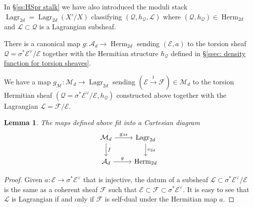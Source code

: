 \documentclass[reqno]{amsart}
\numberwithin{equation}{section}
\newcommand\mnote[1]{\marginpar{\tiny #1}}
\newcommand{\Cal}[1]{\mathcal{#1}}
\DeclareMathOperator{\Herm}{Herm}
\DeclareMathOperator{\Lagr}{Lagr}
\newcommand\xr{\xrightarrow}
\newcommand\ot{\otimes}
\newcommand{\s}{\sigma}
\newcommand\cE{\mathcal{E}}
\newcommand\cF{\mathcal{F}}
\newcommand\cL{\mathcal{L}}
\newcommand\cM{\mathcal{M}}
\newcommand\cQ{\mathcal{Q}}
\newtheorem{lemma}[thm]{Lemma}
\theoremstyle{remark}
\numberwithin{equation}{section}
\begin{document}
In \S\ref{ss:HSpr stalk} we have also introduced the moduli stack $\Lagr_{2d}=\Lagr_{2d}(X'/X)$ classifying $(\cQ,h_{\cQ}, \cL)$ where $(\cQ,h_{\cQ})\in \Herm_{2d}$ and $\cL\subset \cQ$ is a Lagrangian subsheaf. 


There is a canonical map $g: \Cal{A}_d \rightarrow \Herm_{2d}$ sending $(\Cal{E},a)$ to the torsion sheaf $\cQ=\sigma^* \Cal{E}^{\vee}/\Cal{E}$ together with the Hermitian structure $h_{\cQ}$ defined in \S \ref{ssec: density function for torsion sheaves}. 





We have a map $g_{\cM}: \Cal{M}_d \rightarrow \Lagr_{2d}$ sending $(\Cal{E} \xr{t} \Cal{F}) \in \Cal{M}_d$ to the torsion Hermitian sheaf $(\cQ=\sigma^* \Cal{E}^{\vee}/\Cal{E}, h_{\cQ})$ constructed above together with the Lagrangian  $\cL=\Cal{F}/\cE$. 


\begin{lemma}\label{lem: hitchin cartesian} The maps defined above fit into a Cartesian diagram 
\begin{equation}\label{eq: hitchin cartesian}
\begin{tikzcd}
\Cal{M}_d \ar[d, "f"] \ar[r,"g_{\cM}"]  & \Lagr_{2d} \ar[d, "\upsilon_{2d}"] \\
\Cal{A}_d \ar[r, "g"] & \Herm_{2d}
\end{tikzcd}
\end{equation}
\end{lemma}

\begin{proof} Given $a: \Cal{E} \rightarrow \sigma^* \Cal{E}^{\vee}$ that is injective, the datum of a subsheaf $\cL\subset \sigma^* \Cal{E}^{\vee}/\Cal{E}$ is the same as a coherent sheaf $\cF$ such that $\Cal{E} \subset \Cal{F} \subset \sigma^* \Cal{E}^{\vee}$. It is easy to see that $\cL$ is Lagrangian if and only if $\cF$ is self-dual under the Hermitian map $a$.
\end{proof}
\end{document}
